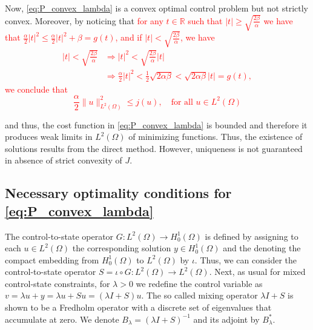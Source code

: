 \documentclass[11pt,a4paper]{amsart}
\newcommand{\om}{\Omega}
\newcommand{\norm}[1]{\lVert #1 \rVert}
\begin{document}
Now, \eqref{eq:P_convex_lambda} is a convex optimal control problem but not strictly convex. Moreover, by noticing that \textcolor{red}{for any $t\in \mathbb{R}$ such that $|t|\ge \sqrt{\frac{2\beta}{\alpha}}$ we have that $\frac{\alpha}{2}|t|^2\le \frac{\alpha}{2}|t|^2+\beta = g(t)$, and if $|t|<\sqrt{\frac{2\beta}{\alpha}}$, we have
\[
\begin{aligned}
|t|<\sqrt{\frac{2\beta}{\alpha}}&\Rightarrow |t|^2<\sqrt{\frac{2\beta}{\alpha}}|t|\\
&\Rightarrow \frac{\alpha}{2}|t|^2<\frac{1}{2}\sqrt{2\alpha\beta}<\sqrt{2\alpha\beta}|t|=g(t), 
\end{aligned}
\]
we conclude that 
\begin{equation}\label{eq:relation_j_norm}
    \frac{\alpha}{2}\norm{u}^2_{L^2(\om)}\le j(u),\quad \text{for all } u\in L^2(\om)
\end{equation}
}

 and thus, the cost function in \eqref{eq:P_convex_lambda} is bounded and therefore it produces weak limits in $L^2(\om)$ of minimizing functions. Thus, the existence of solutions results from the direct method. However, uniqueness is not guaranteed in absence of strict convexity of $J$. 
\subsection{Necessary optimality conditions for \eqref{eq:P_convex_lambda}} 
The control-to-state operator $G: L^2(\om) \to H_0^1(\om)$ is defined by assigning to each $u \in L^2(\om)$ the corresponding solution $y \in H_0^1(\om)$ and the denoting the compact embedding from $H_0^1(\om)$ to  $L^2(\om)$ by $\iota$. Thus, we can consider the control-to-state operator $S=\iota\circ G: L^2(\om) \to L^2(\om) $. Next, as usual for mixed control-state constraints, for $\lambda > 0$ we redefine the control variable as $v = \lambda u + y = \lambda u + Su = (\lambda I + S)u$. The so called mixing operator $\lambda I + S$ is shown to be a Fredholm operator with a discrete set of eigenvalues that accumulate at zero.  We denote $B_\lambda=(\lambda I + S)^{-1}$ and its adjoint by $B_\lambda^{*}$.
\end{document}
